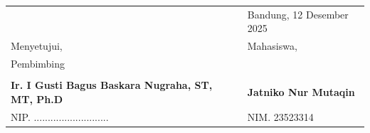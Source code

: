 \documentclass[a4paper,11pt]{article}
\begin{document}
\vspace{1cm}

\begin{table}[h!]
    \centering
    \begin{tabular}{p{7cm} p{7cm}}
        & Bandung, 12 Desember 2025 \\
        Menyetujui, & Mahasiswa, \\
        Pembimbing & \\
        \vspace{2.5cm} & \vspace{2.5cm} \\
        \textbf{Ir. I Gusti Bagus Baskara Nugraha, ST, MT, Ph.D} & \textbf{Jatniko Nur Mutaqin} \\
        NIP. ........................... & NIM. 23523314
    \end{tabular}
\end{table}
\end{document}
